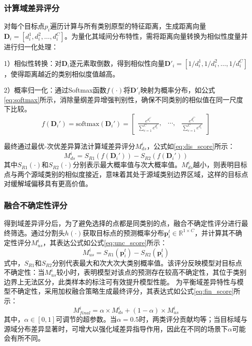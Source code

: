 \subsubsection{计算域差异评分}
对每个目标点\(p_i\)遍历计算与所有类别原型的特征距离，生成距离向量\( \mathbf{D}_i = [d_i^1, d_i^2, \dots, d_i^C] \)。为量化其域间分布特性，需将距离向量转换为相似性度量并进行归一化处理：

1）相似性转换：对\( \mathbf{D}_i\)逐元素取倒数，得到相似性向量\( \mathbf{D'}_i = [1/d_i^1, 1/d_i^2, \dots, 1/d_i^C] \)，使得距离越近的类别相似度值越高。

2）概率归一化：通过Softmax函数\(f(\cdot)\)将\(\mathbf{D'}_i\)映射为概率分布，如公式\eqref{eq:softmax}所示，消除量纲差异增强判别性，确保不同类别的相似值在同一尺度下比较。
\begin{equation}
    \label{eq:softmax}
    f(\mathbf{D}_i') = \text{softmax}(\mathbf{D}_i') = 
    \begin{bmatrix}
    \displaystyle
    \frac{e^{d_i^{1'}}}{\sum_{c=1}^{C} e^{d_i^{c'}}}, &
    \cdots, &
    \displaystyle
    \frac{e^{d_i^{C'}}}{\sum_{c=1}^{C} e^{d_i^{c'}}}
    \end{bmatrix}
\end{equation}

最终通过最优-次优差异算法计算域差异评分\(M^i_{ds}\)，公式如\eqref{eq:dis_score}所示：
\begin{equation}
    \label{eq:dis_score}
    M^i_{ds} = S_{R1}(f(\mathbf{D}_i')) - S_{R2}(f(\mathbf{D}_i'))
\end{equation}
其中\(S_{R1}(\cdot)\)和\(S_{R2}(\cdot)\)分别表示最大概率值与次大概率值。\(M^i_{ds}\)越小，则表明目标点与两个源域类别的相似度接近，意味着其处于源域类别边界区域，这样的目标点对缓解域偏移具有更高价值。

\subsubsection{融合不确定性评分}
得到域差异评分后，为了避免选择的点都是同类别的点，融合不确定性评分进行最终筛选。通过分割头\(h(\cdot)\)获取目标点的预测概率分布\(\mathbf{p}^t_i \in \mathbb{R}^{1\times C}\)，并计算其不确定性评分\( M^i_{us} \)，其表达公式如公式\eqref{eq:unc_score}所示：
\begin{equation}
    \label{eq:unc_score}
    M^i_{us} = S_{R1}(\mathbf{p}_i^t) - S_{R2}(\mathbf{p}_i^t)
\end{equation}
式中，$S_{R1}$和$S_{R2}$分别代表最大和次大次大类别概率值。该评分反映模型对目标点不确定性：当\(M^i_{us}\)较小时，表明模型对该点的预测存在较高不确定性，其位于类别边界上无法区分，此类样本的标注可有效提升模型性能。
为平衡域差异特性与模型不确定性，采用加权融合策略生成最终评分，其表达式如公式\eqref{eq:fin_score}所示：
\begin{equation}
    \label{eq:fin_score}
    M^i_{final} = \alpha \times M^i_{ds} + (1 - \alpha) \times M^i_{us}
\end{equation}
其中，\(\alpha \in [0,1]\)可调节的超参数。当\(\alpha=0.5\)时，两类评分贡献均等；当目标域与源域分布差异显著时，可增大以强化域差异指导作用，因此在不同的场景下\(\alpha\)可能会有所不同。

